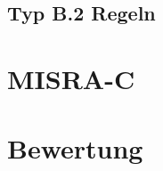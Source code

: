 \documentclass{beamer}
\begin{document}
    \subsection{Typ B.2 Regeln}
    \label{subsec:typ-b-2-regeln}
    \begin{frame}

    \end{frame}

    \section{MISRA-C}
    \label{sec:misra-c}
    \begin{frame}

    \end{frame}

    \section{Bewertung}
    \label{sec:bewertung}
    \begin{frame}

    \end{frame}
\end{document}
